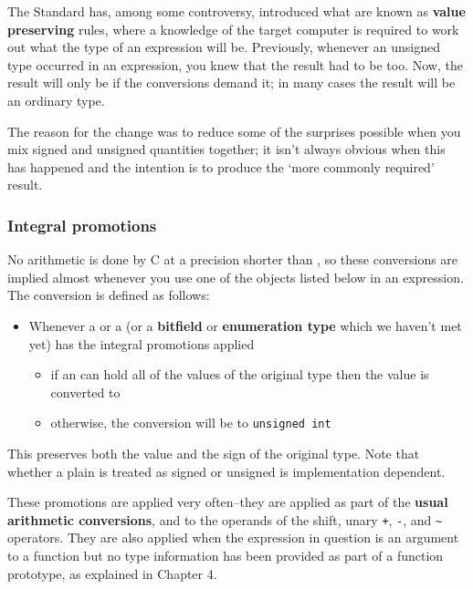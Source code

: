    The Standard has, among some controversy, introduced what are known as
    \textbf{value preserving} rules, where a knowledge of the target
    computer is required to work out what the type of an expression will be.
    Previously, whenever an unsigned type occurred in an expression, you knew
    that the result had to be \unsigned{} too. Now, the result will
    only be \unsigned{} if the conversions demand it; in many cases
    the result will be an ordinary \signed{} type.


   The reason for the change was to reduce some of the surprises possible
    when you mix signed and unsigned quantities together; it isn't always
    obvious when this has happened and the intention is to produce the
    `more commonly required' result.


   \subsubsection{Integral promotions}
    

    No arithmetic is done by C at a precision shorter than
     \kint, so these conversions are implied almost whenever you
     use one of the objects listed below in an expression. The conversion is
     defined as follows:


    \begin{itemize}
     \item Whenever a \short{} or a \kchar{} (or a
      \textbf{bitfield} or \textbf{enumeration type} which we haven't met
      yet) has the integral promotions applied
      \begin{itemize}
       \item if an \kint{} can hold all of the values of the original
        type then the value is converted to \kint{}
       \item otherwise, the conversion will be to \texttt{unsigned int}
      \end{itemize}
     
    \end{itemize}

    This preserves both the value and the sign of the original type. Note
     that whether a plain \kchar{} is treated as signed or unsigned
     is implementation dependent.


    These promotions are applied very often--they are applied as part
     of the \textbf{usual arithmetic conversions}, and to the operands of
     the shift, unary \texttt{+}, \texttt{-}, and \texttt{\~}
     operators. They are also applied when the expression in question is an
     argument to a function but no type information has been provided as part
     of a function prototype, as explained in Chapter 4.


